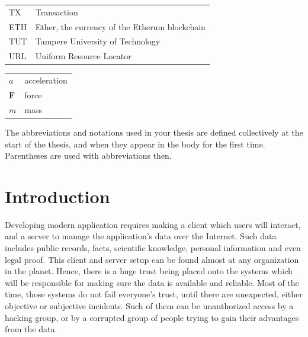 \documentclass[twoside,draftfooter]{tutthesis} %
\begin{document}

\begin{tabular}[h]{@{} p{} p{} @{}}
TX & Transaction \\
ETH & Ether, the currency of the Etherum blockchain \\
TUT & Tampere University of Technology \\
URL & Uniform Resource Locator 
\end{tabular}

\begin{tabular}[h]{@{} p{} p{} @{}}
$a$ & acceleration \\
$\mathbf{F}$ & force \\
$m$ & mass
\end{tabular}

The abbreviations and notations used in your thesis are defined collectively at the start of the thesis, and when they appear in the body for the first time.
Parentheses are used with abbreviations then.



\chapter{Introduction}
\label{ch:Introduction}

Developing modern application requires making a client which users will interact, and a server to manage the application's data over the Internet. Such data includes public records, facts, scientific knowledge, personal information and even legal proof. This client and server setup can be found almost at any organization in the planet. Hence, there is a huge trust being placed onto the systems which will be responsible for making sure the data is available and reliable. Most of the time, those systems do not fail everyone's trust, until there are unexpected, either objective or subjective incidents. Such of them can be unauthorized access by a hacking group, or by a corrupted group of people trying to gain their advantages from the data.
\end{document}
